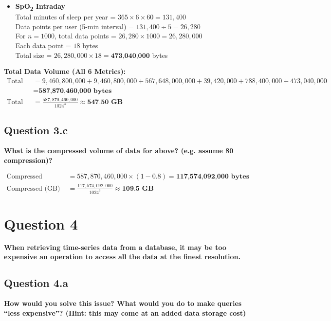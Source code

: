 \documentclass[a4paper, 12pt]{article}
\begin{document}
\begin{itemize}
    \item \textbf{SpO\textsubscript{2} Intraday} \\
    Total minutes of sleep per year = $365 \times 6 \times 60 = 131,400$ \\
    Data points per user (5-min interval) = $131,400 \div 5 = 26,280$ \\
    For $n = 1000$, total data points = $26,280 \times 1000 = 26,280,000$ \\
    Each data point = $18$ bytes \\
    Total size = $26,280,000 \times 18 = \textbf{473,040,000}$ bytes
\end{itemize}

\vspace{1em}

\textbf{Total Data Volume (All 6 Metrics):}
\[
\begin{aligned}
\text{Total (bytes)} &= 9,460,800,000 + 9,460,800,000 + 567,648,000,000 + 39,420,000 + 788,400,000 + 473,040,000 \\
&= \textbf{587,870,460,000 bytes} \\
\text{Total (GB)} &= \frac{587,870,460,000}{1024^3} \approx \textbf{547.50 GB}
\end{aligned}
\]

\subsection*{Question 3.c}
\textbf{What is the compressed volume of data for above? (e.g. assume 80%
compression)?}

\[
\begin{aligned}
\text{Compressed (bytes)} &= 587,870,460,000 \times (1 - 0.8) = \textbf{117,574,092,000 bytes} \\
\text{Compressed (GB)} &= \frac{117,574,092,000}{1024^3} \approx \textbf{109.5 GB}
\end{aligned}
\]

\section*{Question 4}
\textbf{When retrieving time-series data from a database, it may be too expensive an operation
to access all the data at the finest resolution.}
\subsection*{Question 4.a}
\textbf{How would you solve this issue? What would you do to make queries “less expensive”? (Hint: this may come at an added data storage cost)}
\end{document}
